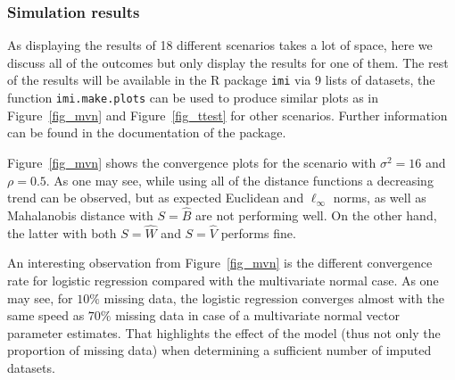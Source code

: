 \documentclass[11pt,a5paper,twoside]{book}
\begin{document}
{{\subsubsection{Simulation results}
As displaying the results of 18 different scenarios takes a lot of space, here we discuss all of the outcomes but only display the results for one of them. The rest of the results will be available in the \textsc{R} package {\tt{imi}} via 9 lists of datasets, the function {\tt{imi.make.plots}} can be used to produce similar plots as in Figure~\ref{fig_mvn} and Figure~\ref{fig_ttest} for other scenarios. Further information can be found in the documentation of the package.

Figure~\ref{fig_mvn} shows the convergence plots for the scenario with $\sigma^2=16$ and $\rho=0.5$. As one may see, while using all of the distance functions a decreasing trend can be observed, but as expected Euclidean and $\ell_{\infty}$ norms, as well as Mahalanobis distance with $S=\widehat{B}$ are not performing well. On the other hand, the latter with both $S=\widehat{W}$ and $S=\widehat{V}$ performs fine. {\color{black}{Note that for $70\%$ missing data for some of the imputed datasets, quasi-complete separation occurs when fitting logistic regression. In such cases, a new imputed dataset is generated.}} 

An interesting observation from Figure~\ref{fig_mvn} is the different convergence rate for logistic regression compared with the multivariate normal case. As one may see, for $10\%$ missing data, the logistic regression converges almost with the same speed as $70\%$ missing data in case of a multivariate normal vector parameter estimates. That highlights the effect of the model (thus not only the proportion of missing data) when determining a sufficient number of imputed datasets.



}}
\end{document}
